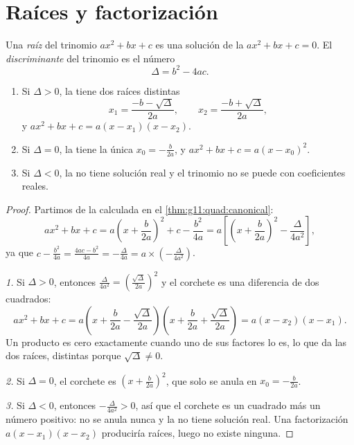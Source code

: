 \section{Raíces y factorización}

\begin{definition}\label{def:g11:quad:discriminant}
Una \emph{raíz} del trinomio $ax^2+bx+c$ es una solución de la
 $ax^2 + bx + c = 0$. El
\emph{discriminante} del trinomio es el número
\[
\Delta = b^2 - 4ac .
\]
\end{definition}

\begin{theorem}[Resolución de $ax^2+bx+c=0$]\label{thm:g11:quad:roots}
\begin{enumerate}
  \item Si $\Delta > 0$, la  tiene dos raíces distintas
        \[
        x_1 = \frac{-b - \sqrt{\Delta}}{2a},
        \qquad
        x_2 = \frac{-b + \sqrt{\Delta}}{2a},
        \]
        y $ax^2+bx+c = a(x - x_1)(x - x_2)$.
  \item Si $\Delta = 0$, la  tiene la única 
        $x_0 = -\frac{b}{2a}$, y $ax^2+bx+c = a(x - x_0)^2$.
  \item Si $\Delta < 0$, la  no tiene solución real y el trinomio
        no se puede  con coeficientes reales.
\end{enumerate}
\end{theorem}

\begin{proof}
Partimos de la  calculada en el
\cref{thm:g11:quad:canonical}:
\[
ax^2+bx+c
= a\left(x + \frac{b}{2a}\right)^2 + c - \frac{b^2}{4a}
= a\left[\left(x + \frac{b}{2a}\right)^2 - \frac{\Delta}{4a^2}\right],
\]
ya que $c - \frac{b^2}{4a} = \frac{4ac - b^2}{4a} = -\frac{\Delta}{4a} =
a \times \left(-\frac{\Delta}{4a^2}\right)$.

\emph{1.} Si $\Delta > 0$, entonces $\frac{\Delta}{4a^2} =
\left(\frac{\sqrt\Delta}{2a}\right)^2$ y el corchete es una diferencia de
dos cuadrados:
\[
ax^2+bx+c = a\left(x + \frac{b}{2a} - \frac{\sqrt\Delta}{2a}\right)
\left(x + \frac{b}{2a} + \frac{\sqrt\Delta}{2a}\right)
= a(x - x_2)(x - x_1).
\]
Un producto es cero exactamente cuando uno de sus factores lo es, lo que
da las dos raíces, distintas porque $\sqrt\Delta \neq 0$.

\emph{2.} Si $\Delta = 0$, el corchete es
$\left(x + \frac{b}{2a}\right)^2$, que solo se anula en
$x_0 = -\frac{b}{2a}$.

\emph{3.} Si $\Delta < 0$, entonces $-\frac{\Delta}{4a^2} > 0$, así que el
corchete es un cuadrado más un número positivo: no se anula nunca y la
 no tiene solución real. Una factorización $a(x-x_1)(x-x_2)$
produciría raíces, luego no existe ninguna.
\end{proof}


